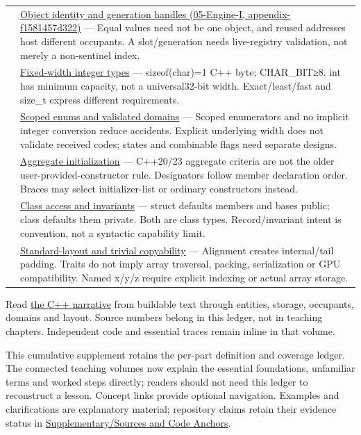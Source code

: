 {\begin{longtable}[]{@{}
  >{\raggedright\arraybackslash}p{}
  >{\raggedright\arraybackslash}p{}@{}}
107 & \href{../05-Engine-I/main.pdf\#nameddest=appendix-f1581457d322}{Object identity and generation handles (05-Engine-I, appendix-f1581457d322)} --- Equal values need not be one object, and reused addresses host different occupants. A slot/generation needs live-registry validation, not merely a non-sentinel index. \\
108 & \hyperref[appendix-cc04044b5782]{Fixed-width integer types} --- sizeof(char)=1 C++ byte; CHAR\_BIT≥8. int has minimum capacity, not a universal32-bit width. Exact/least/fast and size\_t express different requirements. \\
109 & \hyperref[appendix-23640fcee147]{Scoped enums and validated domains} --- Scoped enumerators and no implicit integer conversion reduce accidents. Explicit underlying width does not validate received codes; states and combinable flags need separate designs. \\
110 & \hyperref[appendix-b7174c179542]{Aggregate initialization} --- C++20/23 aggregate criteria are not the older user-provided-constructor rule. Designators follow member declaration order. Braces may select initializer-list or ordinary constructors instead. \\
111 & \hyperref[appendix-8e5214819615]{Class access and invariants} --- struct defaults members and bases public; class defaults them private. Both are class types. Record/invariant intent is convention, not a syntactic capability limit. \\
112 & \hyperref[appendix-958870a64c53]{Standard-layout and trivial copyability} --- Alignment creates internal/tail padding. Traits do not imply array traversal, packing, serialization or GPU compatibility. Named x/y/z require explicit indexing or actual array storage. \\
\end{longtable}
}

Read \href{Continuous\%20Notes/Computing\%20Foundations\%20-\%20From\%20Bits\%20to\%20C++\%20and\%20Systems\%20APIs}{the C++ narrative} from buildable text through entities, storage, occupants, domains and layout. Source numbers belong in this ledger, not in teaching chapters. Independent code and essential traces remain inline in that volume.

This cumulative supplement retains the per-part definition and coverage ledger. The connected teaching volumes now explain the essential foundations, unfamiliar terms and worked steps directly; readers should not need this ledger to reconstruct a lesson. Concept links provide optional navigation. Examples and clarifications are explanatory material; repository claims retain their evidence status in \hyperref[appendix-a103e7846d21]{Supplementary/Sources and Code Anchors}.

